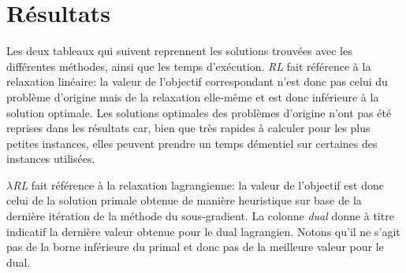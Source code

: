 \section{Résultats}

Les deux tableaux qui suivent reprennent les solutions trouvées avec les différentes méthodes,
ainsi que les temps d'exécution. \textit{RL} fait référence à la relaxation linéaire:
la valeur de l'objectif correspondant n'est donc pas celui du problème d'origine mais de la
relaxation elle-même et est donc inférieure à la solution optimale.
Les solutions optimales des problèmes d'origine n'ont pas été reprises dans les résultats car, bien
que très rapides à calculer pour les plus petites instances, elles peuvent prendre un temps
démentiel sur certaines des instances utilisées.

\textit{$\lambda$RL} fait référence à la relaxation lagrangienne: la valeur de l'objectif est donc
celui de la solution primale obtenue de manière heuristique sur base de la dernière itération
de la méthode du sous-gradient. La colonne \textit{dual} donne à titre indicatif la dernière valeur obtenue
pour le dual lagrangien. Notons qu'il ne s'agit pas de la borne inférieure du primal et donc pas de la
meilleure valeur pour le dual.

